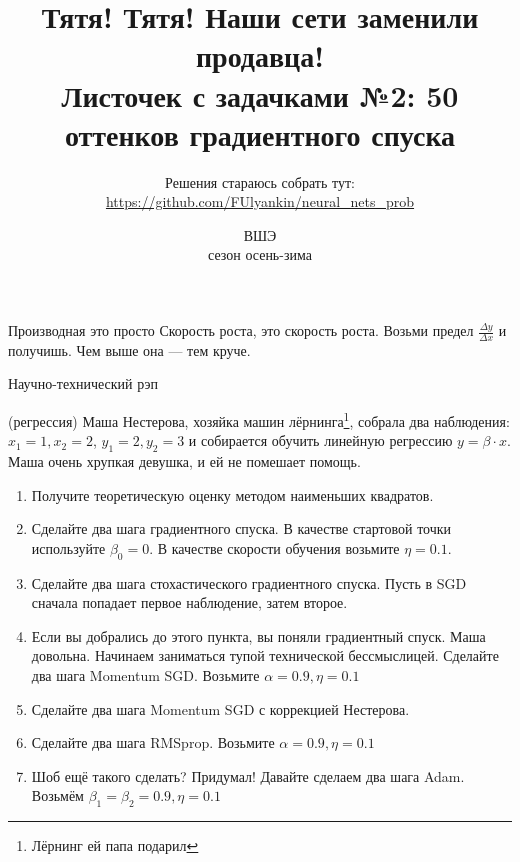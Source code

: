 \documentclass[12pt, a4paper, oneside]{article}
\title{%
	Тятя! Тятя! Наши сети заменили продавца! \\
	\large Листочек с задачками №2: 50 оттенков градиентного спуска
}
\date{ВШЭ \\ сезон осень-зима}
\author{Решения стараюсь собрать тут:  \\ \url{https://github.com/FUlyankin/neural_nets_prob} }
\theoremstyle{plain} %
\theoremstyle{definition}
\begin{document}
	
	\maketitle
	
\epigraph{Производная это просто \newline Скорость роста, это скорость роста. \newline Возьми предел $\frac{\Delta y}{\Delta x}$ и получишь. \newline Чем выше она --- тем круче.}{Научно-технический рэп}

\begin{problem}{(регрессия)}
	Маша Нестерова, хозяйка машин лёрнинга\footnote{Лёрнинг ей папа подарил},  собрала два наблюдения: $x_1 = 1, x_2 = 2$, $y_1 = 2, y_2 = 3$ и собирается обучить линейную регрессию $y = \beta \cdot x$.  Маша очень хрупкая девушка, и ей не помешает помощь. 
	
	\begin{enumerate}
		\item Получите теоретическую оценку методом наименьших квадратов.
		
		\item  Сделайте два шага градиентного спуска. В качестве стартовой точки используйте $\beta_0 = 0$.  В качестве скорости обучения возьмите $\eta = 0.1$. 
		
		\item Сделайте два шага стохастического градиентного спуска.  Пусть в SGD сначала попадает первое наблюдение, затем второе. 
		
		\item Если вы добрались до этого пункта, вы поняли градиентный спуск. Маша довольна. Начинаем заниматься тупой технической бессмыслицей. Сделайте два шага Momentum SGD. Возьмите $\alpha = 0.9, \eta = 0.1$
		
		\item  Сделайте два шага Momentum SGD с коррекцией Нестерова. 
		
		\item Сделайте два шага RMSprop.  Возьмите $\alpha = 0.9, \eta = 0.1$
		
		\item  Шоб ещё такого сделать? Придумал! Давайте сделаем два шага Adam. Возьмём  $\beta_1 = \beta_2 = 0.9, \eta = 0.1$		
	\end{enumerate}
\end{problem}

\newpage 
\end{document}
